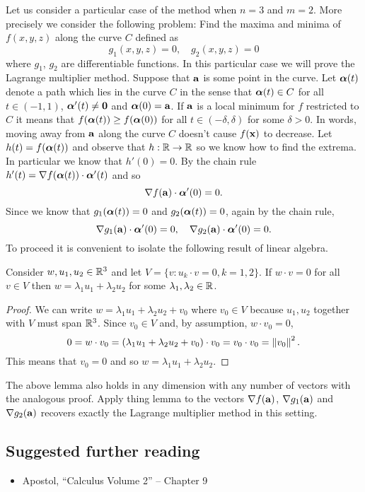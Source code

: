 Let us consider a particular case of the method when \(n=3\) and \(m=2\).
More precisely we consider the following problem: 
Find the maxima and minima of \(f(x,y,z)\) along the curve \(C\) defined as 
\[
    g_1(x,y,z) = 0, 
    \quad
    g_2(x,y,z) = 0
\]
where \(g_1\), \(g_2\) are differentiable functions.
In this particular case we will prove the Lagrange multiplier method.
Suppose that \(\aa\) is some point in the curve.
Let \(\aalpha(t)\) denote a path which lies in the curve \(C\) in the sense that \(\aalpha(t) \in C\) for all \(t\in (-1,1)\), \(\aalpha'(t)\neq \mathbf{0}\) and \(\aalpha(0)=\aa\).
If \(\aa\) is a local minimum for \(f\) restricted to \(C\) it means that \(f(\aalpha(t))\geq f(\aalpha(0))\) for all \(t \in (-\delta,\delta)\) for some \(\delta>0\). 
In words, moving away from \(\aa\) along the curve \(C\) doesn't cause \(f(\xx)\) to decrease.
Let \(h(t) = f(\aalpha(t))\) and observe that \(h:\bR \to \bR\) so we know how to find the extrema.
In particular we know that \(h'(0)=0\).
By the chain rule \(h'(t) = \nabla f(\aalpha(t))\cdot \aalpha'(t)\) and so 
\[
    \nabla f(\aa)\cdot \aalpha'(0) = 0.
\]
Since we know that \(g_1(\aalpha(t))=0\) and \(g_2(\aalpha(t))=0\), again by the chain rule,
\[
    \nabla g_1(\aa)\cdot \aalpha'(0) = 0,
    \quad 
    \nabla g_2(\aa)\cdot \aalpha'(0) = 0.
\]
To proceed it is convenient to isolate the following result of linear algebra.
\begin{lemma*}
    Consider \(w, u_1,u_2 \in \bR^3\) and let \(V = \{v : u_k \cdot v = 0, k =1,2\}\).
    If \(w\cdot v =0\) for all \(v \in V\) then \(w = \lambda_1 u_1 + \lambda_2 u_2\) for some \(\lambda_1,\lambda_2 \in \bR\). 
\end{lemma*}
\begin{proof}
    We can write \(w = \lambda_1 u_1 + \lambda_2 u_2 + v_0\) where \(v_0 \in V\) because \(u_1, u_2\) together with \(V\) must span \(\bR^3\).
    Since \(v_0 \in V\) and, by assumption, \(w\cdot v_0 = 0\),
    \[
        0 = w\cdot v_0
        = (\lambda_1 u_1 + \lambda_2 u_2 + v_0)\cdot v_0
        = v_0\cdot v_0 
        = \norm{v_0}^2.
    \] 
    This means that \(v_0 =0\) and so \(w = \lambda_1 u_1 + \lambda_2 u_2\).
\end{proof}

The above lemma also holds in any dimension with any number of vectors with the analogous proof.
Apply thing lemma to the vectors \(\nabla f(\aa)\), \(\nabla g_1(\aa)\) and \(\nabla g_2(\aa)\) recovers exactly the Lagrange multiplier method in this setting.


\subsection*{Suggested further reading}

\begin{itemize}
  \item Apostol, ``Calculus Volume 2'' -- Chapter 9
\end{itemize}

